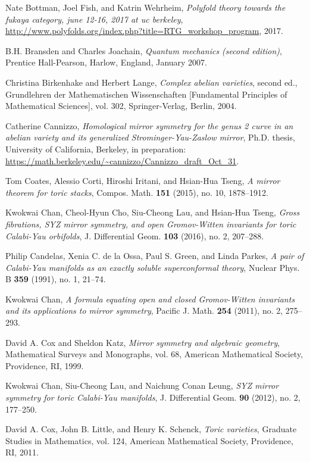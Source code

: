 \begin{description}[leftmargin=7.4em, labelwidth=6.8em, labelsep=0.6em,
                   font=\normalfont, itemsep=0.35em, parsep=0pt]
\item[{[BFW17]}] Nate Bottman, Joel Fish, and Katrin Wehrheim, \emph{Polyfold theory towards the fukaya category, june 12-16, 2017 at uc berkeley}, \url{http://www.polyfolds.org/index.php?title=RTG_workshop_program}, 2017.
\item[{[BJ07]}] B.H. Bransden and Charles Joachain, \emph{Quantum mechanics (second edition)}, Prentice Hall-Pearson, Harlow, England, January 2007.
\item[{[BL04]}] Christina Birkenhake and Herbert Lange, \emph{Complex abelian varieties}, second ed., Grundlehren der Mathematischen Wissenschaften [Fundamental Principles of Mathematical Sciences], vol. 302, Springer-Verlag, Berlin, 2004.
\item[{[Can]}] Catherine Cannizzo, \emph{Homological mirror symmetry for the genus 2 curve in an abelian variety and its generalized Strominger-Yau-Zaslow mirror}, Ph.D. thesis, University of California, Berkeley, in preparation: \url{https://math.berkeley.edu/~cannizzo/Cannizzo_draft_Oct_31}.
\item[{[CCIT15]}] Tom Coates, Alessio Corti, Hiroshi Iritani, and Hsian-Hua Tseng, \emph{A mirror theorem for toric stacks}, Compos. Math. \textbf{151} (2015), no. 10, 1878--1912.
\item[{[CCLT16]}] Kwokwai Chan, Cheol-Hyun Cho, Siu-Cheong Lau, and Hsian-Hua Tseng, \emph{Gross fibrations, SYZ mirror symmetry, and open Gromov-Witten invariants for toric Calabi-Yau orbifolds}, J. Differential Geom. \textbf{103} (2016), no. 2, 207--288.
\item[{[CdlOGP91]}] Philip Candelas, Xenia C. de la Ossa, Paul S. Green, and Linda Parkes, \emph{A pair of Calabi-Yau manifolds as an exactly soluble superconformal theory}, Nuclear Phys. B \textbf{359} (1991), no. 1, 21--74.
\item[{[Cha11]}] Kwokwai Chan, \emph{A formula equating open and closed Gromov-Witten invariants and its applications to mirror symmetry}, Pacific J. Math. \textbf{254} (2011), no. 2, 275--293.
\item[{[CK99]}] David A. Cox and Sheldon Katz, \emph{Mirror symmetry and algebraic geometry}, Mathematical Surveys and Monographs, vol. 68, American Mathematical Society, Providence, RI, 1999.
\item[{[CLL12]}] Kwokwai Chan, Siu-Cheong Lau, and Naichung Conan Leung, \emph{SYZ mirror symmetry for toric Calabi-Yau manifolds}, J. Differential Geom. \textbf{90} (2012), no. 2, 177--250.
\item[{[CLS11]}] David A. Cox, John B. Little, and Henry K. Schenck, \emph{Toric varieties}, Graduate Studies in Mathematics, vol. 124, American Mathematical Society, Providence, RI, 2011.


\end{description}
